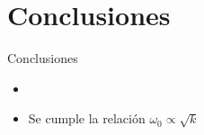 \section{Conclusiones}\label{sec:conclusiones}

\begin{frame}{Conclusiones}
    \Large{
    \begin{itemize}
        \item
        \item Se cumple la relación $\omega_0 \propto \sqrt{k}$
    \end{itemize}
    }
\end{frame}